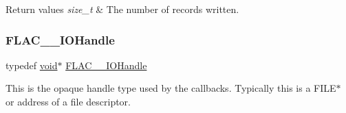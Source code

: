 \begin{DoxyRetVals}{Return values}
{\em size\+\_\+t} & The number of records written. \\
\hline
\end{DoxyRetVals}
\mbox{\label{group__flac__callbacks_ga4c329c3168dee6e352384c5e9306260d}} 
\subsubsection{\texorpdfstring{F\+L\+A\+C\+\_\+\+\_\+\+I\+O\+Handle}{FLAC\_\_IOHandle}}
{\footnotesize\ttfamily typedef \hyperlink{png_8h_ac9c84fa68bbad002983e35ce3663c686}{void}$\ast$ \hyperlink{group__flac__callbacks_ga4c329c3168dee6e352384c5e9306260d}{F\+L\+A\+C\+\_\+\+\_\+\+I\+O\+Handle}}

This is the opaque handle type used by the callbacks. Typically this is a {\ttfamily F\+I\+L\+E$\ast$} or address of a file descriptor. 